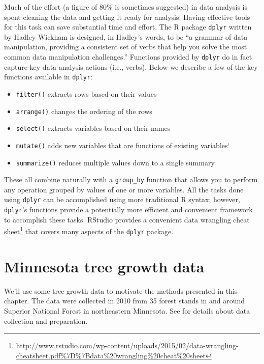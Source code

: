 \documentclass[]{krantz}
\providecommand{\tightlist}{%
  \setlength{\itemsep}{0pt}\setlength{\parskip}{0pt}}
\renewcommand{\href}[2]{#2\footnote{\url{#1}}}
\theoremstyle{definition}
\theoremstyle{definition}
\theoremstyle{definition}
\theoremstyle{remark}
\begin{document}
Much of the effort (a figure of 80\% is sometimes suggested) in data
analysis is spent cleaning the data and getting it ready for analysis.
Having effective tools for this task can save substantial time and
effort. The R package \texttt{dplyr} written by Hadley Wickham is
designed, in Hadley's words, to be ``a grammar of data manipulation,
providing a consistent set of verbs that help you solve the most common
data manipulation challenges.'' Functions provided by \texttt{dplyr} do
in fact capture key data analysis actions (i.e., verbs). Below we
describe a few of the key functions available in \texttt{dplyr}:

\begin{itemize}
\tightlist
\item
  \texttt{filter()} extracts rows based on their values
\item
  \texttt{arrange()} changes the ordering of the rows
\item
  \texttt{select()} extracts variables based on their names
\item
  \texttt{mutate()} adds new variables that are functions of existing
  variables`
\item
  \texttt{summarize()} reduces multiple values down to a single summary
\end{itemize}

These all combine naturally with a \texttt{group\_by} function that
allows you to perform any operation grouped by values of one or more
variables. All the tasks done using \texttt{dplyr} can be accomplished
using more traditional R syntax; however, \texttt{dplyr}'s functions
provide a potentially more efficient and convenient framework to
accomplish these tasks. RStudio provides a convenient
\href{http://www.rstudio.com/wp-content/uploads/2015/02/data-wrangling-cheatsheet.pdf\%7D\%7Bdata\%20wrangling\%20cheat\%20sheet}{data
wrangling cheat sheet} that covers many aspects of the \texttt{dplyr}
package.

\section{Minnesota tree growth data}\label{minnesota-tree-growth-data}

We'll use some tree growth data to motivate the methods presented in
this chapter. The data were collected in 2010 from 35 forest stands in
and around Superior National Forest in northeastern Minnesota. See
\citet{foster14} for details about data collection and preparation.
\end{document}
